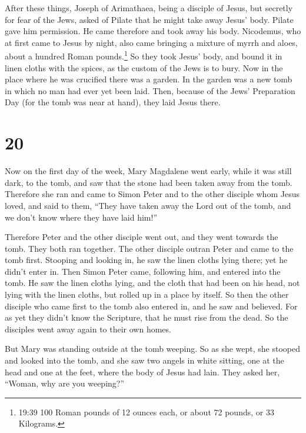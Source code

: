  After these things, Joseph of Arimathaea, being a disciple
of Jesus, but secretly for fear of the Jews, asked of Pilate that he
might take away Jesus' body. Pilate gave him permission. He came
therefore and took away his body.  Nicodemus, who at first
came to Jesus by night, also came bringing a mixture of myrrh and aloes,
about a hundred Roman pounds.\footnote{19:39 100 Roman pounds of 12
  ounces each, or about 72 pounds, or 33 Kilograms.}  So
they took Jesus' body, and bound it in linen cloths with the spices, as
the custom of the Jews is to bury.  Now in the place where
he was crucified there was a garden. In the garden was a new tomb in
which no man had ever yet been laid.  Then, because of the
Jews' Preparation Day (for the tomb was near at hand), they laid Jesus
there.

\hypertarget{section-19}{%
\section{20}\label{section-19}}

 Now on the first day of the week, Mary Magdalene went
early, while it was still dark, to the tomb, and saw that the stone had
been taken away from the tomb.  Therefore she ran and came
to Simon Peter and to the other disciple whom Jesus loved, and said to
them, ``They have taken away the Lord out of the tomb, and we don't know
where they have laid him!''

 Therefore Peter and the other disciple went out, and they
went towards the tomb.  They both ran together. The other
disciple outran Peter and came to the tomb first.  Stooping
and looking in, he saw the linen cloths lying there; yet he didn't enter
in.  Then Simon Peter came, following him, and entered into
the tomb. He saw the linen cloths lying,  and the cloth that
had been on his head, not lying with the linen cloths, but rolled up in
a place by itself.  So then the other disciple who came
first to the tomb also entered in, and he saw and believed. 
For as yet they didn't know the Scripture, that he must rise from the
dead.  So the disciples went away again to their own homes.

 But Mary was standing outside at the tomb weeping. So as
she wept, she stooped and looked into the tomb,  and she
saw two angels in white sitting, one at the head and one at the feet,
where the body of Jesus had lain.  They asked her, ``Woman,
why are you weeping?''

